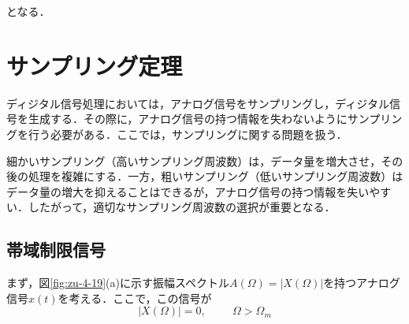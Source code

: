 \noindent となる\footnotemark ．

\section{サンプリング定理}

ディジタル信号処理においては，アナログ信号をサンプリングし，ディジタル信号を生成する．その際に，アナログ信号の持つ情報を失わないようにサンプリングを行う必要がある．ここでは，サンプリングに関する問題を扱う．

細かいサンプリング（高いサンプリング周波数）は，データ量を増大させ，その後の処理を複雑にする．一方，粗いサンプリング（低いサンプリング周波数）はデータ量の増大を抑えることはできるが，アナログ信号の持つ情報を失いやすい．したがって，適切なサンプリング周波数の選択が重要となる．

\subsection{帯域制限信号}

まず，図\ref{fig:zu-4-19}(a)に示す振幅スペクトル$A(\Omega)=|X(\Omega)|$を持つアナログ信号$x(t)$を考える．ここで，この信号が
\begin{equation}
|X(\Omega)| = 0, \hspace{1cm} \Omega > \Omega_m
\end{equation}

